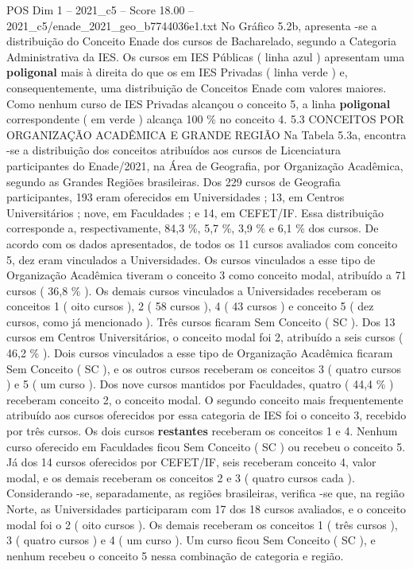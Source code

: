 \begin{textsample}{POS Dim 1 – 2021\_c5 – Score 18.00 – 2021\_c5/enade\_2021\_geo\_b7744036e1.txt}
No Gráfico 5.2b, apresenta -se a distribuição do Conceito Enade dos cursos de Bacharelado, segundo a Categoria Administrativa da IES.
Os cursos em IES Públicas ( linha azul ) apresentam uma \textbf{poligonal} mais à direita do que os em IES Privadas ( linha verde ) e, consequentemente, uma distribuição de Conceitos Enade com valores maiores.
Como nenhum curso de IES Privadas alcançou o conceito 5, a linha \textbf{poligonal} correspondente ( em verde ) alcança 100 \% no conceito 4. 5.3 CONCEITOS POR ORGANIZAÇÃO ACADÊMICA E GRANDE REGIÃO Na Tabela 5.3a, encontra -se a distribuição dos conceitos atribuídos aos cursos de Licenciatura participantes do Enade/2021, na Área de Geografia, por Organização Acadêmica, segundo as Grandes Regiões brasileiras.
Dos 229 cursos de Geografia participantes, 193 eram oferecidos em Universidades ; 13, em Centros Universitários ; nove, em Faculdades ; e 14, em CEFET/IF.
Essa distribuição corresponde a, respectivamente, 84,3 \%, 5,7 \%, 3,9 \% e 6,1 \% dos cursos.
De acordo com os dados apresentados, de todos os 11 cursos avaliados com conceito 5, dez eram vinculados a Universidades.
Os cursos vinculados a esse tipo de Organização Acadêmica tiveram o conceito 3 como conceito modal, atribuído a 71 cursos ( 36,8 \% ).
Os demais cursos vinculados a Universidades receberam os conceitos 1 ( oito cursos ), 2 ( 58 cursos ), 4 ( 43 cursos ) e conceito 5 ( dez cursos, como já mencionado ).
Três cursos ficaram Sem Conceito ( SC ).
Dos 13 cursos em Centros Universitários, o conceito modal foi 2, atribuído a seis cursos ( 46,2 \% ).
Dois cursos vinculados a esse tipo de Organização Acadêmica ficaram Sem Conceito ( SC ), e os outros cursos receberam os conceitos 3 ( quatro cursos ) e 5 ( um curso ).
Dos nove cursos mantidos por Faculdades, quatro ( 44,4 \% ) receberam conceito 2, o conceito modal.
O segundo conceito mais frequentemente atribuído aos cursos oferecidos por essa categoria de IES foi o conceito 3, recebido por três cursos.
Os dois cursos \textbf{restantes} receberam os conceitos 1 e 4.
Nenhum curso oferecido em Faculdades ficou Sem Conceito ( SC ) ou recebeu o conceito 5.
Já dos 14 cursos oferecidos por CEFET/IF, seis receberam conceito 4, valor modal, e os demais receberam os conceitos 2 e 3 ( quatro cursos cada ).
Considerando -se, separadamente, as regiões brasileiras, verifica -se que, na região Norte, as Universidades participaram com 17 dos 18 cursos avaliados, e o conceito modal foi o 2 ( oito cursos ).
Os demais receberam os conceitos 1 ( três cursos ), 3 ( quatro cursos ) e 4 ( um curso ).
Um curso ficou Sem Conceito ( SC ), e nenhum recebeu o conceito 5 nessa combinação de categoria e região.

\end{textsample}
